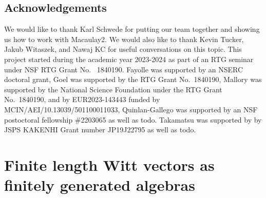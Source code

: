 \documentclass{article}
\theoremstyle{plain}
\theoremstyle{definition}
\begin{document}
\subsection*{Acknowledgements}
We would like to thank Karl Schwede for putting our team together and showing us how to work with Macaulay2.
We would also like to thank Kevin Tucker, Jakub Witaszek, and Nawaj KC for useful conversations on this topic. This project started during the academic year 2023-2024 as part of an RTG seminar under NSF RTG Grant No.~ 1840190. 
Fayolle was supported by an NSERC doctoral grant, 
Goel was supported by the RTG Grant No.~1840190,
Mallory was supported by the National Science Foundation under the RTG Grant No.~1840190, and by EUR2023-143443 funded by MCIN/AEI/10.13039/501100011033,
Quinlan-Gallego was supported by an NSF postoctoral fellowship \#2203065 as well as {\color{red} todo}.
Takamatsu was supported by by JSPS KAKENHI Grant number JP19J22795 as well as {\color{red} todo}.

\section{Finite length Witt vectors as finitely generated algebras}
\end{document}
